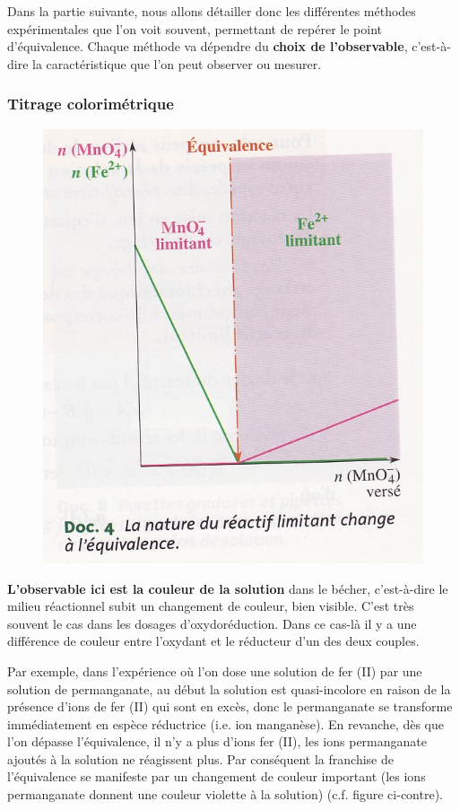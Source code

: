 \documentclass[11pt,a4paper]{article}
\begin{document}
Dans la partie suivante, nous allons détailler donc les différentes méthodes expérimentales que l'on voit souvent, permettant de repérer le point d'équivalence. Chaque méthode va dépendre du \textbf{choix de l'observable}, c'est-à-dire la caractéristique que l'on peut observer ou mesurer.

\subsubsection{Titrage colorimétrique}

\begin{figure}
  \centering
  \includegraphics[width=.95\linewidth]{imgs/c1/graphequiv.jpg}
\end{figure} 

\textbf{L’observable ici est la couleur de la solution} dans le bécher, c'est-à-dire le milieu réactionnel subit un changement de couleur, bien visible. C’est très souvent le cas dans les dosages d’oxydoréduction.  Dans ce cas-là il y a une différence de couleur entre l’oxydant et le réducteur d’un des deux couples.

Par exemple, dans l’expérience où l’on dose une solution de fer (II) par une solution de permanganate, au début la solution est quasi-incolore en raison de la présence d’ions de fer (II) qui sont en excès, donc le permanganate se transforme immédiatement en espèce réductrice (i.e. ion manganèse).  En revanche, dès que l’on dépasse l’équivalence, il n’y a plus d’ions fer (II), les ions permanganate ajoutés à la solution ne réagissent plus. Par conséquent la franchise de l’équivalence se manifeste par un changement de couleur important (les ions permanganate donnent une couleur violette à la solution) (c.f. figure ci-contre). 
\end{document}
